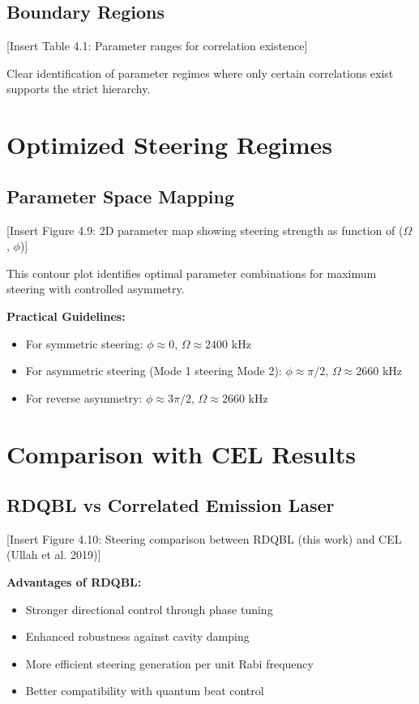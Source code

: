 \subsection{Boundary Regions}

[Insert Table 4.1: Parameter ranges for correlation existence]

Clear identification of parameter regimes where only certain correlations exist supports the strict hierarchy.

\section{Optimized Steering Regimes}

\subsection{Parameter Space Mapping}

[Insert Figure 4.9: 2D parameter map showing steering strength as function of ($\Omega$, $\phi$)]

This contour plot identifies optimal parameter combinations for maximum steering with controlled asymmetry.

\textbf{Practical Guidelines:}
\begin{itemize}
	\item For symmetric steering: $\phi \approx 0$, $\Omega \approx 2400$ kHz
	\item For asymmetric steering (Mode 1 steering Mode 2): $\phi \approx \pi/2$, $\Omega \approx 2660$ kHz
	\item For reverse asymmetry: $\phi \approx 3\pi/2$, $\Omega \approx 2660$ kHz
\end{itemize}

\section{Comparison with CEL Results}

\subsection{RDQBL vs Correlated Emission Laser}

[Insert Figure 4.10: Steering comparison between RDQBL (this work) and CEL (Ullah et al. 2019)]

\textbf{Advantages of RDQBL:}
\begin{itemize}
	\item Stronger directional control through phase tuning
	\item Enhanced robustness against cavity damping
	\item More efficient steering generation per unit Rabi frequency
	\item Better compatibility with quantum beat control
\end{itemize}

